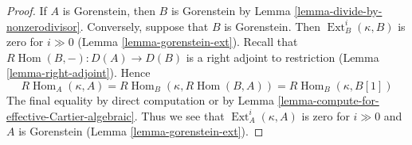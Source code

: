 \documentclass[10pt,a4paper]{amsart}
\theoremstyle{plain}
\theoremstyle{definition}
\theoremstyle{remark}
\numberwithin{equation}{subsection}
\def\Hom{\mathop{\mathrm{Hom}}\nolimits}
\def\Ext{\mathop{\mathrm{Ext}}\nolimits}
\begin{document}
\begin{proof}
If $A$ is Gorenstein, then $B$ is Gorenstein by
Lemma \ref{lemma-divide-by-nonzerodivisor}.
Conversely, suppose that $B$ is Gorenstein. Then
$\Ext^i_B(\kappa, B)$ is zero for $i \gg 0$
(Lemma \ref{lemma-gorenstein-ext}).
Recall that $R\Hom(B, -) : D(A) \to D(B)$ is a right adjoint
to restriction (Lemma \ref{lemma-right-adjoint}).
Hence
$$
R\Hom_A(\kappa, A) = R\Hom_B(\kappa, R\Hom(B, A)) =
R\Hom_B(\kappa, B[1])
$$
The final equality by direct computation or by
Lemma \ref{lemma-compute-for-effective-Cartier-algebraic}.
Thus we see that $\Ext^i_A(\kappa, A)$ is zero for
$i \gg 0$ and $A$ is Gorenstein (Lemma \ref{lemma-gorenstein-ext}).
\end{proof}
\end{document}
